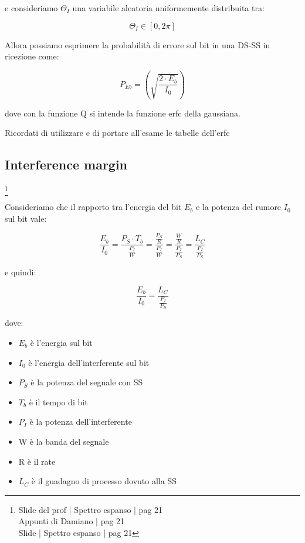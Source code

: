 e consideriamo $\varTheta_I$ una variabile aleatoria uniformemente distribuita tra: 

{
    \Large 
    \begin{equation}
        \varTheta_I \in [0, 2\pi]
    \end{equation}
}

Allora possiamo esprimere la probabilità di errore sul bit in una DS-SS in ricezione come: 

{
    \Large 
    \begin{equation}
        P_{Eb} 
        = 
        \left(
            \sqrt{\frac{2 \cdot E_b}{I_0}}
        \right)
    \end{equation}
}

dove con la funzione Q si intende la funzione erfc della gaussiana. \newline 

\begin{tcolorbox}
    Ricordati di utilizzare e di portare all'esame le tabelle dell'erfc
\end{tcolorbox}

\newpage 

\subsection{Interference margin}
\footnote{Slide del prof | Spettro espanso | pag 21 \\
Appunti di Damiano | pag 21 \\
Slide | Spettro espanso | pag 21 
} 

Consideriamo che il rapporto tra l'energia del bit $E_b$ e la potenza del rumore $I_0$ sul bit vale:

{
    \Large 
    \begin{equation}
            \frac{E_b}{I_0}
            =
            \frac{P_S \cdot T_b}{\frac{P_I}{W}}
            = 
            \frac{\frac{P_S}{R}}{\frac{P_I}{W}}
            = 
            \frac{\frac{W}{R}}{\frac{P_I}{P_S}}
            =
            \frac{L_C}{\frac{P_I}{P_S}}
    \end{equation}
}

e quindi: 

{
    \Large 
    \begin{equation}
        \frac{E_b}{I_0}
        =  
        \frac{L_C}{\frac{P_I}{P_S}}
    \end{equation}
}

dove: 

\begin{itemize}
    \item $E_b$ è l'energia sul bit 
    \item $I_0$ è l'energia dell'interferente sul bit
    \item $P_S$ è la potenza del segnale con SS
    \item $T_b$ è il tempo di bit 
    \item $P_I$ è la potenza dell'interferente 
    \item W è la banda del segnale 
    \item R è il rate
    \item $L_C$ è il guadagno di processo dovuto alla SS 
\end{itemize}

